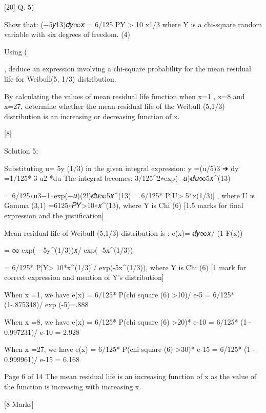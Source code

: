 [20]
Q. 5)
\item  Show that: \intexp(−5𝑦13)𝑑𝑦∞𝑥 = 6/125 P{Y > 10 x1/3}
where Y is a chi-square random variable with six degrees of freedom.
(4)
\item   Using (\item , deduce an expression involving a chi-square probability for the mean residual life for Weibull(5, 1/3) distribution.


\item   By calculating the values of mean residual life function when x=1 , x=8 and x=27, determine whether the mean residual life of the Weibull (5,1/3) distribution is an increasing or decreasing function of x.

[8]



Solution 5:
\item 
Substituting u= 5y (1/3) in the given integral expression:
y =(u/5)3
➔ dy =1/125* 3 u2 *du 
The integral becomes: 3/125\intu^2∗exp(−𝑢)ⅆ𝑢∞5𝑥^(13)

= 6/125∗u3−1∗exp(−𝑢)(2!)ⅆ𝑢∞5𝑥^(13)
= 6/125* P[U> 5*x(1/3)] , where U is Gamma (3,1) 
=6125∗𝑃{𝑌>10∗𝑥^(13)}, where Y is Chi (6)
[1.5 marks for final expression and the justification]

\item  
Mean residual life of Weibull (5,1/3) distribution is :
e(x)= ⅆ𝑦∞𝑥/ (1-F(x))

= ∞ exp( −5y^(1/3))𝑥/ exp( -5x^(1/3))

= 6/125* P[Y> 10*x^(1/3)]/ exp(-5x^(1/3)), where Y is Chi (6)
[1 mark for correct expression and mention of Y’s distribution]

\item  
When x =1, we have e(x) = 6/125* P(chi square (6) >10)/ e-5
= 6/125* (1-.875348)/ exp (-5)=.888

When x =8, we have e(x) = 6/125* P(chi square (6) >20)* e-10
= 6/125* (1 - 0.997231)/ e-10 = 2.928

When x =27, we have e(x) = 6/125* P(chi square (6) >30)* e-15
= 6/125* (1 - 0.999961)/ e-15 = 6.168

Page 6 of 14
The mean residual life is an increasing function of x as the value of the function is increasing with increasing x.


[8 Marks]
